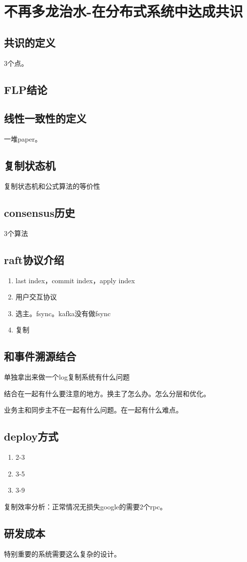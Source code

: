 \chapter{不再多龙治水-在分布式系统中达成共识}



\section{共识的定义}
3个点。

\section{FLP结论}
\label{flpexplained}
\cite{Fischer1985}

\section{线性一致性的定义}
一堆paper。

\section{复制状态机}
复制状态机和公式算法的等价性

\section{consensus历史}
3个算法

\section{raft协议介绍}
\begin{enumerate}
    \item last index，commit index，apply index
    \item 用户交互协议
    \item 选主。fsync。kafka没有做fsync
    \item 复制
\end{enumerate}



\section{和事件溯源结合}
单独拿出来做一个log复制系统有什么问题

结合在一起有什么要注意的地方。换主了怎么办。怎么分层和优化。

业务主和同步主不在一起有什么问题。在一起有什么难点。

\section{deploy方式}
\begin{enumerate}
    \item 2-3
    \item 3-5
    \item 3-9
\end{enumerate}


复制效率分析：正常情况无损失google的需要2个rpc。

\section{研发成本}
特别重要的系统需要这么复杂的设计。

